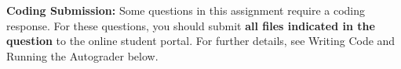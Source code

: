 {\bf Coding Submission:}
Some questions in this assignment require a coding response.  For these questions, you should submit \textbf{all files indicated in the question} to the online student portal.  For further details, see Writing Code and Running the Autograder below.
